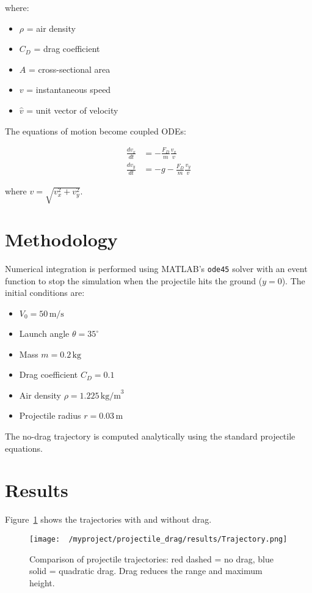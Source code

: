\documentclass[12pt,a4paper]{article}
\begin{document}
where:  
\begin{itemize}
    \item $\rho$ = air density
    \item $C_D$ = drag coefficient
    \item $A$ = cross-sectional area
    \item $v$ = instantaneous speed
    \item $\hat{v}$ = unit vector of velocity
\end{itemize}

The equations of motion become coupled ODEs:

\begin{align}
\frac{d v_x}{dt} &= - \frac{F_D}{m} \frac{v_x}{v} \\
\frac{d v_y}{dt} &= -g - \frac{F_D}{m} \frac{v_y}{v}
\end{align}

where $v = \sqrt{v_x^2 + v_y^2}$.

\section{Methodology}
Numerical integration is performed using MATLAB's \texttt{ode45} solver with an event function to stop the simulation when the projectile hits the ground ($y=0$). The initial conditions are:

\begin{itemize}
    \item $V_0 = 50 \, \text{m/s}$
    \item Launch angle $\theta = 35^\circ$
    \item Mass $m = 0.2 \, \text{kg}$
    \item Drag coefficient $C_D = 0.1$
    \item Air density $\rho = 1.225 \, \text{kg/m}^3$
    \item Projectile radius $r = 0.03 \, \text{m}$
\end{itemize}

The no-drag trajectory is computed analytically using the standard projectile equations.

\section{Results}
Figure~\ref{fig:trajectory} shows the trajectories with and without drag.

\begin{figure}[h!]
    \centering
    \texttt{[image: ~/myproject/projectile\_drag/results/Trajectory.png]} %
    \caption{Comparison of projectile trajectories: red dashed = no drag, blue solid = quadratic drag. Drag reduces the range and maximum height.}
    \label{fig:trajectory}
\end{figure}
\end{document}
